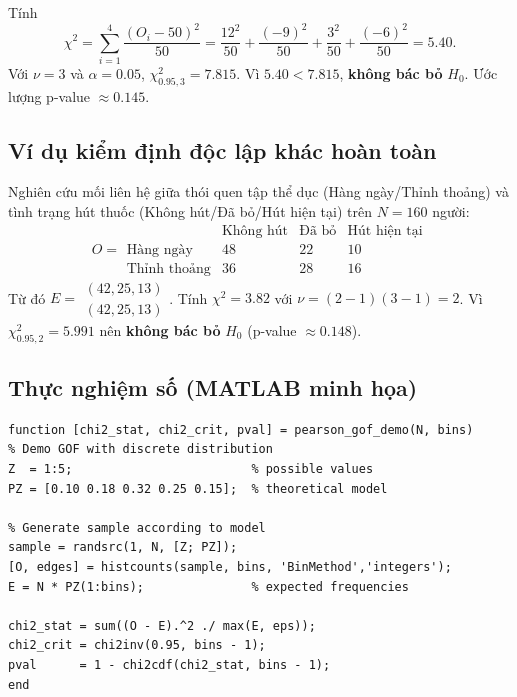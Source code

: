 Tính
\[
\chi^2=\sum_{i=1}^{4}\frac{(O_i-50)^2}{50}=\frac{12^2}{50}+\frac{(-9)^2}{50}+\frac{3^2}{50}+\frac{(-6)^2}{50}=5.40.
\]
Với $\nu=3$ và $\alpha=0.05$, $\chi^2_{0.95,3}=7.815$. Vì $5.40<7.815$, \textbf{không bác bỏ} $H_0$. Ước lượng p-value $\approx0.145$.

\subsection{Ví dụ kiểm định độc lập khác hoàn toàn}
Nghiên cứu mối liên hệ giữa thói quen tập thể dục (Hàng ngày/Thỉnh thoảng) và tình trạng hút thuốc (Không hút/Đã bỏ/Hút hiện tại) trên $N=160$ người:
\[
O=\begin{array}{c|ccc}
 & \text{Không hút} & \text{Đã bỏ} & \text{Hút hiện tại}\\\hline
\text{Hàng ngày} & 48 & 22 & 10\\
\text{Thỉnh thoảng} & 36 & 28 & 16
\end{array}
\]
Từ đó $E=\begin{smallmatrix}(42,25,13)\\(42,25,13)\end{smallmatrix}$. Tính $\chi^2=3.82$ với $\nu=(2-1)(3-1)=2$. Vì $\chi^2_{0.95,2}=5.991$ nên \textbf{không bác bỏ} $H_0$ (p-value $\approx0.148$).

\subsection{Thực nghiệm số (MATLAB minh họa)}
\begin{matlab}
\begin{lstlisting}
function [chi2_stat, chi2_crit, pval] = pearson_gof_demo(N, bins)
% Demo GOF with discrete distribution
Z  = 1:5;                         % possible values
PZ = [0.10 0.18 0.32 0.25 0.15];  % theoretical model

% Generate sample according to model
sample = randsrc(1, N, [Z; PZ]);
[O, edges] = histcounts(sample, bins, 'BinMethod','integers');
E = N * PZ(1:bins);               % expected frequencies

chi2_stat = sum((O - E).^2 ./ max(E, eps));
chi2_crit = chi2inv(0.95, bins - 1);
pval      = 1 - chi2cdf(chi2_stat, bins - 1);
end
\end{lstlisting}
\end{matlab}

